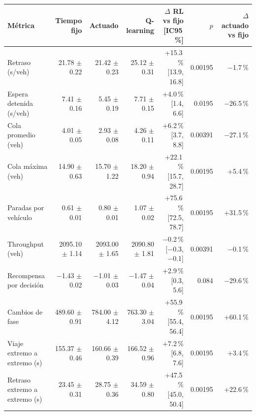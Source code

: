 \begin{table}[H]
\centering
\scriptsize
\setlength{\tabcolsep}{3pt}
\setlength{\tabcolsep}{2pt}
\begin{tabular}{lrrrrrr}
\toprule
Métrica & Tiempo fijo & Actuado & Q-learning & \makecell{$\Delta$ RL vs fijo\\{}[IC95\,\%]} & $p$ & \makecell{$\Delta$ actuado\\vs fijo} \\
\midrule
Retraso (s/veh) & 21.78 $\pm$ 0.22 & 21.42 $\pm$ 0.23 & 25.12 $\pm$ 0.31 & \makecell{+15.3\,\%\\{}[13.9, 16.8]} & 0.00195 & $-$1.7\,\% \\
Espera detenida (s/veh) & 7.41 $\pm$ 0.16 & 5.45 $\pm$ 0.19 & 7.71 $\pm$ 0.15 & \makecell{+4.0\,\%\\{}[1.4, 6.6]} & 0.0195 & $-$26.5\,\% \\
Cola promedio (veh) & 4.01 $\pm$ 0.05 & 2.93 $\pm$ 0.08 & 4.26 $\pm$ 0.11 & \makecell{+6.2\,\%\\{}[3.7, 8.8]} & 0.00391 & $-$27.1\,\% \\
Cola máxima (veh) & 14.90 $\pm$ 0.63 & 15.70 $\pm$ 1.22 & 18.20 $\pm$ 0.94 & \makecell{+22.1\,\%\\{}[15.7, 28.7]} & 0.00195 & +5.4\,\% \\
Paradas por vehículo & 0.61 $\pm$ 0.01 & 0.80 $\pm$ 0.01 & 1.07 $\pm$ 0.02 & \makecell{+75.6\,\%\\{}[72.5, 78.7]} & 0.00195 & +31.5\,\% \\
Throughput (veh) & 2095.10 $\pm$ 1.14 & 2093.00 $\pm$ 1.65 & 2090.80 $\pm$ 1.81 & \makecell{$-$0.2\,\%\\{}[$-$0.3, $-$0.1]} & 0.00391 & $-$0.1\,\% \\
Recompensa por decisión & $-$1.43 $\pm$ 0.02 & $-$1.01 $\pm$ 0.03 & $-$1.47 $\pm$ 0.04 & \makecell{+2.9\,\%\\{}[0.3, 5.6]} & 0.084 & $-$29.6\,\% \\
Cambios de fase & 489.60 $\pm$ 0.91 & 784.00 $\pm$ 4.12 & 763.30 $\pm$ 3.04 & \makecell{+55.9\,\%\\{}[55.4, 56.4]} & 0.00195 & +60.1\,\% \\
Viaje extremo a extremo (s) & 155.37 $\pm$ 0.46 & 160.66 $\pm$ 0.39 & 166.52 $\pm$ 0.96 & \makecell{+7.2\,\%\\{}[6.8, 7.6]} & 0.00195 & +3.4\,\% \\
Retraso extremo a extremo (s) & 23.45 $\pm$ 0.31 & 28.75 $\pm$ 0.36 & 34.59 $\pm$ 0.80 & \makecell{+47.5\,\%\\{}[45.0, 50.4]} & 0.00195 & +22.6\,\% \\

\end{tabular}
\end{table}
